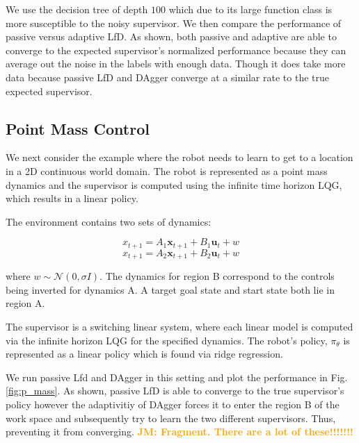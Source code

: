 \documentclass[10pt, conference]{ieeeconf}      %
\newcommand{\bu}{\mathbf{u}}
\newcommand{\bx}{\mathbf{x}}
\newcommand{\jmnote}[1]{%
 {\textcolor{orange}{\textbf{JM: #1}}}{}}
\begin{document}
We use the  decision tree  of depth $100$ which due to its large function class is more susceptible to the noisy supervisor. We then compare the performance of passive versus adaptive LfD. As shown, both passive and adaptive are able to converge to the expected supervisor's normalized performance because they can average out the noise in the labels with enough data. Though it does take more data because passive LfD  and DAgger converge at a similar rate to the true expected supervisor. 




\subsection{Point Mass Control}
We next consider the example where the robot needs to learn to get to a location in a 2D continuous world domain. The robot is represented as a point mass dynamics and the supervisor is computed using the infinite time horizon LQG, which results in a linear policy. 

The environment contains two sets of dynamics: 

$$x_{t+1} = A_1\bx_{t+1}+B_1\bu_t+w$$
$$x_{t+1} = A_2\bx_{t+1}+B_2\bu_t + w$$

where $w\sim \mathcal{N}(0,\sigma I)$. The dynamics for region B correspond to the controls being inverted for dynamics A. A target goal state and start state both lie in region A. 

The supervisor is a switching linear system, where each linear model is computed via the infinite horizon LQG for the specified dynamics. The robot's policy, $\pi_{\theta}$ is represented as a linear policy which is found via ridge regression.

We run passive Lfd and DAgger in this setting and plot the performance in Fig. \ref{fig:p_mass}. As shown, passive LfD is able to converge to the true supervisor's policy however the adaptivitiy of DAgger forces it to enter the region B of the work space and subsequently try to learn the two different supervisors. Thus, preventing it from converging. \jmnote{Fragment. There are a lot of these!!!!!!!}
\end{document}
